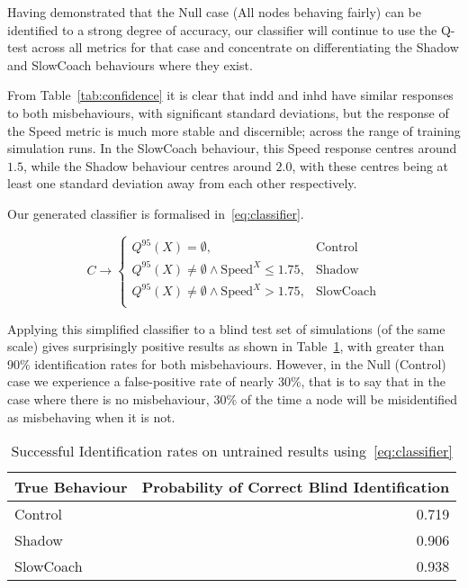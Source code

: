 Having demonstrated that the Null case (All nodes behaving fairly) can be identified to a strong degree of accuracy, our classifier will continue to use the Q-test across all metrics for that case and concentrate on differentiating the Shadow and SlowCoach behaviours where they exist.

From Table~\ref{tab:confidence} it is clear that \gls{indd} and \gls{inhd} have similar responses to both misbehaviours, with significant standard deviations, but the response of the Speed metric is much more stable and discernible; across the range of training simulation runs.
In the SlowCoach behaviour, this Speed response centres around $1.5$, while the Shadow behaviour centres around $2.0$, with these centres being at least one standard deviation away from each other respectively.

Our generated classifier is formalised in~\autoref{eq:classifier}.

\begin{equation}
  C \rightarrow 
  \begin{cases}
    Q^{95}(X) = \emptyset,& \text{Control}\\
    Q^{95}(X) \neq \emptyset \land \text{Speed}^X \leq 1.75, & \text{Shadow}\\
    Q^{95}(X) \neq \emptyset \land \text{Speed}^X > 1.75,& \text{SlowCoach}\\
  \end{cases}
  \label{eq:classifier}
\end{equation}

Applying this simplified classifier to a blind test set of simulations (of the same scale) gives surprisingly positive results as shown in Table~\ref{tab:classifier}, with greater than 90\% identification rates for both misbehaviours.
However, in the Null (Control) case we experience a false-positive rate of nearly 30\%, that is to say that in the case where there is no misbehaviour, 30\% of the time a node will be misidentified as misbehaving when it is not.

\begin{table}[h]
  \caption{Successful Identification rates on untrained results using~\autoref{eq:classifier}}
  \centering
  \begin{tabular}{lr}
    \toprule
    True Behaviour &  Probability of Correct Blind Identification \\
    \midrule
    Control        &                                        0.719 \\
    Shadow         &                                        0.906 \\
    SlowCoach      &                                        0.938 \\
    \bottomrule
  \end{tabular}
  \label{tab:classifier}
\end{table}

